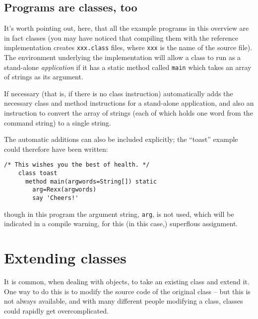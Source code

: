 \subsection{Programs are classes, too}
It’s worth pointing out, here, that all the example programs in this overview are in fact classes (you may have noticed that compiling them with the reference implementation creates \texttt{xxx.class} files, where \texttt{xxx} is the name of the source file). The environment underlying the implementation will allow a class to run as a stand-alone \emph{application} if it has a static method called \texttt{main} which takes an array of strings as its argument.

If necessary (that is, if there is no class instruction) \nr{} automatically adds the necessary class and method instructions for a stand-alone application, and also an instruction to convert the array of strings (each of which holds one word from the command string) to a single \nr{} string.

The automatic additions can also be included explicitly; the “toast”
example could therefore have been written:
\begin{lstlisting}[label=toast,caption=New Toast]
    /* This wishes you the best of health. */
    class toast
      method main(argwords=String[]) static
        arg=Rexx(argwords)
        say 'Cheers!'
\end{lstlisting}
though in this program the argument string, \texttt{arg}, is not used,
which will be indicated in a compile warning, for this (in this case,) superflous assignment.
\section{Extending classes}
It is common, when dealing with objects, to take an existing class and
extend it. One way to do this is to modify the source code of the
original class – but this is not always available, and with many different people modifying a class, classes could rapidly get overcomplicated.

